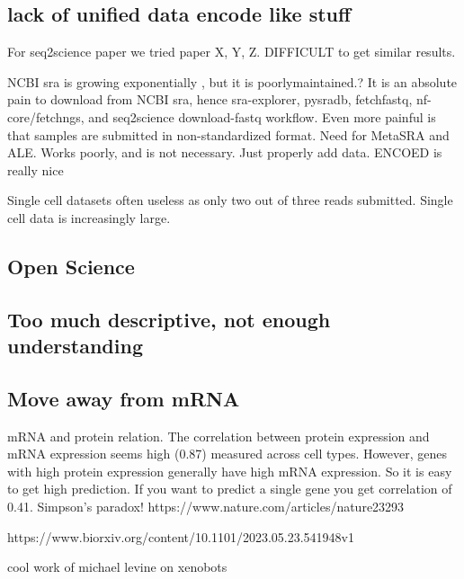 \subsection{lack of unified data encode like stuff}

For seq2science paper we tried paper X, Y, Z. DIFFICULT to get similar results.     

% 

NCBI sra is growing exponentially \cite{srawebsite}, but it is poorlymaintained.? It is an absolute pain to download from NCBI sra, hence sra-explorer, pysradb, fetchfastq, nf-core/fetchngs, and seq2science download-fastq workflow. Even more painful is that samples are submitted in non-standardized format. Need for MetaSRA and ALE. Works poorly, and is not necessary. Just properly add data. ENCOED is really nice

Single cell datasets often useless as only two out of three reads submitted. Single cell data is increasingly large.

\subsection{Open Science}



\subsection{Too much descriptive, not enough understanding}

\subsection{Move away from mRNA}

mRNA and protein relation.
The correlation between protein expression and mRNA expression seems high (0.87) measured across cell types. However, genes with high protein expression generally have high mRNA expression. So it is easy to get high prediction. If you want to predict a single gene you get correlation of 0.41. Simpson's paradox! 
https://www.nature.com/articles/nature23293

https://www.biorxiv.org/content/10.1101/2023.05.23.541948v1

cool work of michael levine on xenobots

